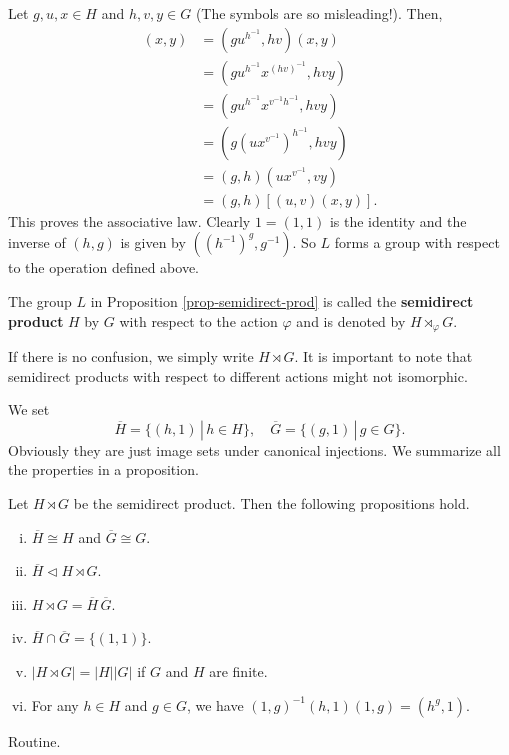 \begin{sketch}
	Let $g, u, x \in H$ and $h, v, y \in G$ (The symbols are so misleading!). Then,
	\begin{align*}
		[(g, h)(u, v)](x, y) &= (gu^{h^{-1}},hv)(x, y) \\
		&= (gu^{h^{-1}}x^{(hv)^{-1}},hvy)
		\\
		&= (gu^{h^{-1}}x^{v^{-1}h^{-1}},hvy)
		\\
		&= (g(ux^{v^{-1}})^{h^{-1}},hvy)
		\\
		&= (g,h)(ux^{v^{-1}},vy)
		\\
		&=  (g, h)[(u, v)(x, y)].
	\end{align*}
	This proves the associative law. Clearly $1 = (1, 1)$ is the identity and the inverse of $(h, g)$ is given by $((h^{-1})^{g}, g^{-1})$. So $L$ forms a group with respect to the operation defined above.
\end{sketch}


\begin{definition}
	The group $L$ in Proposition \ref{prop-semidirect-prod} is called the \textbf{semidirect product} $H$ by $G$ with respect to the action $\varphi$ and is denoted by $H\rtimes_{\varphi} G$.
\end{definition}
 \begin{remark}
 	If there is no confusion, we simply write $H\rtimes G$. It is important to note that semidirect products with respect to different actions might not isomorphic. 
 \end{remark}
 
 We set
$$\overline{H} = \{(h,1) \,|\, h \in H\},\quad\overline{G} = \{(g,1)\,|\, g \in G\}.$$
Obviously they are just image sets under canonical injections.  We summarize all the properties in a proposition.
\begin{proposition} \label{prop-semidirect-prod-properties}
	Let $H \rtimes G$ be the semidirect product. Then the following propositions hold.
	\begin{enumerate}[(i)]
		\item $\overline{H} \cong H$ and $\overline{G}\cong G$.
		\item $\overline{H} \lhd  H \rtimes G$.
		\item $H \rtimes G= \overline{H}\,\overline{G}$.
		\item $\overline{H} \cap \overline{G} = \{(1,1)\}$.
		\item $|H \rtimes G| = |H|  |G|$ if $G$ and $H$ are finite.
		\item For any $h \in H$ and $g \in G$, we have $(1,g)^{-1}(h,1)(1,g) = (h^g,1)$.
	\end{enumerate}
\end{proposition} 
\begin{sketch}
	Routine.
\end{sketch}

